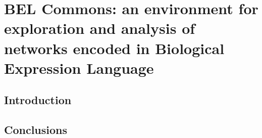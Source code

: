 \chapter{BEL Commons: an environment for exploration and analysis of networks encoded in Biological Expression Language}\label{chap:belcommons}

\section*{Introduction}

\vspace*{\fill}



\section*{Conclusions}
